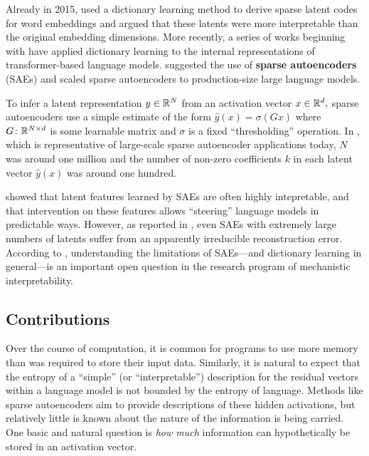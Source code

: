 Already in 2015, \cite{faruqui_sparse_2015} used a dictionary learning method to derive sparse latent codes for word embeddings and argued that these latents were more interpretable than the original embedding dimensions. More recently, a series of works beginning with \cite{yun_transformer_2021} have applied dictionary learning to the internal representations of transformer-based language models. \cite{cunningham_sparse_2023} suggested the use of \textbf{sparse autoencoders} (SAEs) and \cite{templeton_scaling_2024, gao_scaling_2024} scaled sparse autoencoders to production-size large language models.

To infer a latent representation $y \in \mathbb{R}^N$ from an activation vector $x \in \mathbb{R}^d,$ sparse autoencoders use a simple estimate of the form $\hat y(x) = \sigma(G x)$ where $G \colon \mathbb{R}^{N \times d}$ is some learnable matrix and $\sigma$ is a fixed ``thresholding'' operation. In \cite{gao_scaling_2024}, which is representative of large-scale sparse autoencoder applications today, $N$ was around one million and the number of non-zero coefficients $k$ in each latent vector $\hat y(x)$ was around one hundred.

\cite{templeton_scaling_2024} showed that latent features learned by SAEs are often highly intepretable, and that intervention on these features allows ``steering'' language models in predictable ways. However, as reported in \cite{gao_scaling_2024}, even SAEs with extremely large numbers of latents suffer from an apparently irreducible reconstruction error. According to \cite{sharkey_open_2025}, understanding the limitations of SAEs---and dictionary learning in general---is an important open question in the research program of mechanistic interpretability.

\subsection*{Contributions}

Over the course of computation, it is common for programs to use more memory than was required to store their input data. Similarly, it is natural to expect that the entropy of a ``simple'' (or ``interpretable'') description for the residual vectors within a language model is not bounded by the entropy of language. Methods like sparse autoencoders aim to provide descriptions of these hidden activations, but relatively little is known about the nature of the information is being carried. One basic and natural question is \textit{how much} information can hypothetically be stored in an activation vector.

